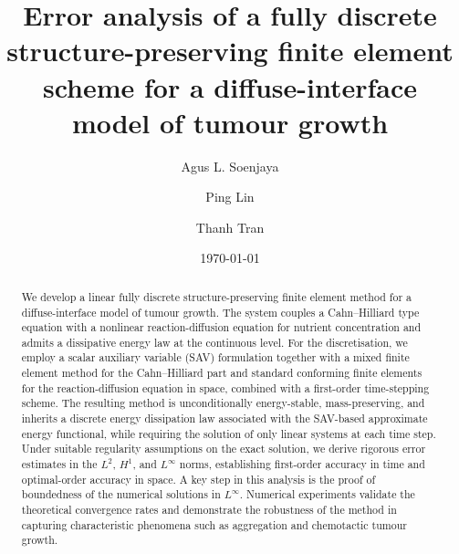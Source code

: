 \documentclass[11pt, reqno]{amsart}
\theoremstyle{definition}
\numberwithin{equation}{section}
\begin{document}
	\setcounter{page}{1}
	
	\title[Error analysis of SAV-FEM for tumour growth model]
	{Error analysis of a fully discrete structure-preserving finite element scheme for a diffuse-interface model of tumour growth}
	
	\author[Agus L. Soenjaya]{Agus L. Soenjaya}
	\address{School of Mathematics and Statistics, The University of New South Wales, Sydney 2052, Australia}
	\email{\textcolor[rgb]{0.00,0.00,0.84}{a.soenjaya@unsw.edu.au}}
	
	\author[Ping Lin]{Ping Lin}
	\address{Division of Mathematics, University of Dundee, Dundee, DD1 4HN, UK}
	\email{\textcolor[rgb]{0.00,0.00,0.84}{p.lin@dundee.ac.uk}}
	
	\author[Thanh Tran]{Thanh Tran}
	\address{School of Mathematics and Statistics, The University of New South Wales, Sydney 2052, Australia}
	\email{\textcolor[rgb]{0.00,0.00,0.84}{thanh.tran@unsw.edu.au}}
	
	\date{\today}
	
	\keywords{}
	\subjclass{}
	
	\begin{abstract}
	   We develop a linear fully discrete structure-preserving finite element method for a diffuse-interface model of tumour growth. The system couples a Cahn--Hilliard type equation with a nonlinear reaction-diffusion equation for nutrient concentration and admits a dissipative energy law at the continuous level. For the discretisation, we employ a scalar auxiliary variable (SAV) formulation together with a mixed finite element method for the Cahn--Hilliard part and standard conforming finite elements for the reaction-diffusion equation in space, combined with a first-order time-stepping scheme. The resulting method is unconditionally energy-stable, mass-preserving, and inherits a discrete energy dissipation law associated with the SAV-based approximate energy functional, while requiring the solution of only linear systems at each time step. Under suitable regularity assumptions on the exact solution, we derive rigorous error estimates in the $L^2$, $H^1$, and $L^\infty$ norms, establishing first-order accuracy in time and optimal-order accuracy in space. A key step in this analysis is the proof of boundedness of the numerical solutions in $L^\infty$. Numerical experiments validate the theoretical convergence rates and demonstrate the robustness of the method in capturing characteristic phenomena such as aggregation and chemotactic tumour growth.
	\end{abstract}
	\maketitle
	\tableofcontents
    
\end{document}

